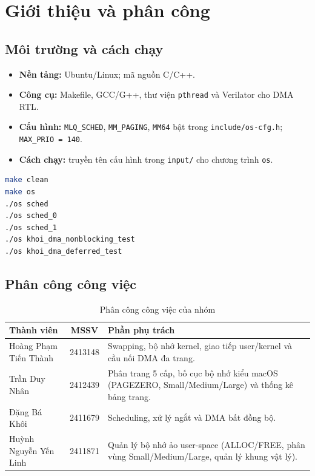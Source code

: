 \documentclass[12pt,a4paper]{article}
\begin{document}
	\section{Giới thiệu và phân công}

	\subsection{Môi trường và cách chạy}
	\begin{itemize}
	    \item \textbf{Nền tảng:} Ubuntu/Linux; mã nguồn C/C++.
	    \item \textbf{Công cụ:} Makefile, GCC/G++, thư viện \texttt{pthread} và Verilator cho DMA RTL.
	    \item \textbf{Cấu hình:} \texttt{MLQ\_SCHED}, \texttt{MM\_PAGING}, \texttt{MM64} bật trong \texttt{include/os-cfg.h}; \texttt{MAX\_PRIO = 140}.
	    \item \textbf{Cách chạy:} truyền tên cấu hình trong \texttt{input/} cho chương trình \texttt{os}.
	\end{itemize}

	\begin{lstlisting}[language=bash]
make clean
make os
./os sched
./os sched_0
./os sched_1
./os khoi_dma_nonblocking_test
./os khoi_dma_deferred_test
	\end{lstlisting}

	\subsection{Phân công công việc}
	\begin{table}[H]
	\centering\small
	\begin{tabularx}{\linewidth}{|l|c|X|}
	\hline
	\textbf{Thành viên} & \textbf{MSSV} & \textbf{Phần phụ trách} \\
	\hline
	Hoàng Phạm Tiến Thành & 2413148 & Swapping, bộ nhớ kernel, giao tiếp user/kernel và cầu nối DMA đa trang. \\
	\hline
	Trần Duy Nhân & 2412439 & Phân trang 5 cấp, bố cục bộ nhớ kiểu macOS (PAGEZERO, Small/Medium/Large) và thống kê bảng trang. \\
	\hline
	Đặng Bá Khôi & 2411679 & Scheduling, xử lý ngắt và DMA bất đồng bộ. \\
	\hline
	Huỳnh Nguyễn Yến Linh & 2411871 & Quản lý bộ nhớ ảo user-space (ALLOC/FREE, phân vùng Small/Medium/Large, quản lý khung vật lý). \\
	\hline
	\end{tabularx}
	\caption{Phân công công việc của nhóm}
	\end{table}
\end{document}
